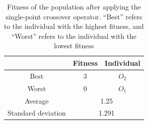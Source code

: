  \begin{table}[H]
    \centering
    \begin{tabular}{|c|c|c|}
      \hline
            & \textbf{Fitness} & \textbf{Individual}  \\
      \hline
      Best  & 3 & \(O_2\) \\
      Worst & 0 & \(O_1\) \\
      \hline
      \hline
      Average & \multicolumn{2}{c|}{1.25} \\
      \hline
      Standard deviation & \multicolumn{2}{c|}{1.291} \\
      \hline
    \end{tabular}
    \caption{
      Fitness of the population after applying the single-point crossover 
      operator.
      \enquote{Best} refers to the individual with the highest fitness, and 
      \enquote{Worst} refers to the individual with the lowest fitness
    }
    \label{tab:bg:ga:var:cx:single_point:fitness}
  \end{table}

